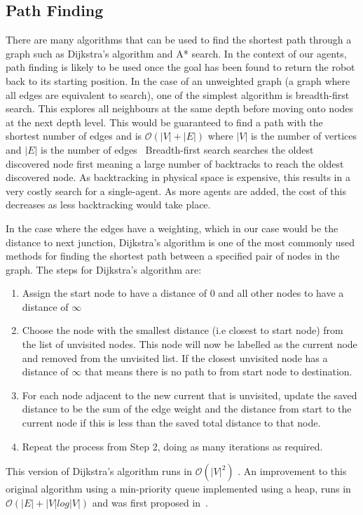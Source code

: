 \subsection{Path Finding}\label{litreview/maze/path}
There are many algorithms that can be used to find the shortest path 
through a graph such as Dijkstra's algorithm and A* search. In the 
context of our agents, path finding is likely to be used once 
the goal has been found to return the robot back to its starting 
position. In the case of an unweighted graph (a graph where all edges are 
equivalent to search), one of the simplest algorithm 
is breadth-first search. This explores all neighbours at the same depth 
before moving onto nodes at the next depth level. This would be guaranteed 
to find a path with the shortest number of edges and is $\mathcal{O}(|V| + |E|)$ 
where $|V|$ is the number of vertices and $|E|$ is the number of edges~\cite{cormen2009introduction}
Breadth-first search searches the oldest discovered node first meaning 
a large number of backtracks to reach the oldest discovered node. As 
backtracking in physical space is expensive, this results in a very 
costly search for a single-agent. As more agents are added, the cost of this 
decreases as less backtracking would take place. 

In the case where the edges have a weighting, which in our case would be the 
distance to next junction, Dijkstra's algorithm is one 
of the most commonly used methods for finding the shortest path between a 
specified pair of nodes in the graph. The steps for Dijkstra's algorithm are:
\begin{enumerate}
\item Assign the start node to have a distance of 0 and all other nodes to 
have a distance of $\infty$
\item Choose the node with the smallest distance (i.e closest to start node) 
from the list of unvisited nodes. This node will now be labelled as the 
current node and removed from the unvisited list. If the closest unvisited 
node has a distance of $\infty$ that means there is no path to from start 
node to destination.
\item For each node adjacent to the new current that is unvisited, update 
the saved distance to be the sum of the edge weight and the distance from 
start to the current node if this is less than the saved total distance to 
that node. 
\item Repeat the process from Step 2, doing as many iterations as required.
\end{enumerate}
This version of Dijkstra's algorithm runs in $\mathcal{O}(|V|^{2})$ 
\cite{xu2007improved}. An improvement to this original algorithm using a 
min-priority queue implemented using a heap, runs in $\mathcal{O}
(|E| + |V|log |V|)$ and was first proposed in~\cite{fredman1987fibonacci}.


